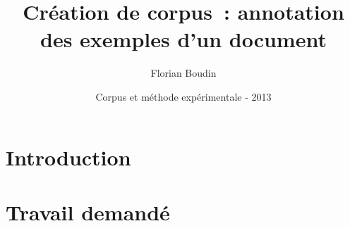 \documentclass[12pt,a4paper]{article}
\begin{document}
\title{Création de corpus~: annotation des exemples d'un document}
\author{Florian Boudin}
\date{Corpus et méthode expérimentale - 2013}

\maketitle

\section{Introduction}


\section{Travail demandé}
\end{document}
